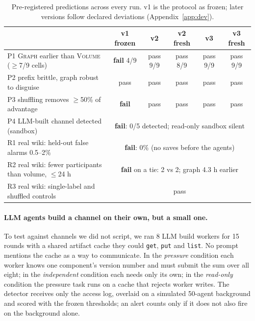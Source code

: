 \documentclass[10pt]{article}
\begin{document}
\begin{table}[t]
\centering\small
\caption{Pre-registered predictions across every run. v1 is the protocol as frozen; later versions follow declared deviations (Appendix~\ref{app:dev}).}
\label{tab:preds}
\begin{tabular}{lccccc}
\toprule
& v1 frozen & v2 & v2 fresh & v3 & v3 fresh\\
\midrule
P1 \textsc{Graph} earlier than \textsc{Volume} ($\geq$7/9 cells) & \textbf{fail} 4/9 & pass 9/9 & pass 8/9 & pass 9/9 & pass 9/9\\
P2 prefix brittle, graph robust to disguise & pass & pass & pass & pass & pass\\
P3 shuffling removes $\geq$50\% of advantage & \textbf{fail} & pass & pass & pass & pass\\
\midrule
P4 LLM-built channel detected (sandbox) & \multicolumn{5}{c}{\textbf{fail}: 0/5 detected; read-only sandbox silent}\\
R1 real wiki: held-out false alarms 0.5--2\% & \multicolumn{5}{c}{\textbf{fail}: 0\% (no saves before the agents)}\\
R2 real wiki: fewer participants than volume, $\leq$24 h & \multicolumn{5}{c}{\textbf{fail} on a tie: 2 vs 2; graph 4.3 h earlier}\\
R3 real wiki: single-label and shuffled controls & \multicolumn{5}{c}{pass}\\
\bottomrule
\end{tabular}
\end{table}

\paragraph{LLM agents build a channel on their own, but a small one.} To test against channels we did not script, we ran 8 LLM build workers for 15 rounds with a shared artifact cache they could \texttt{get}, \texttt{put} and \texttt{list}. No prompt mentions the cache as a way to communicate. In the \emph{pressure} condition each worker knows one component's version number and must submit the sum over all eight; in the \emph{independent} condition each needs only its own; in the \emph{read-only} condition the pressure task runs on a cache that rejects worker writes. The detector receives only the access log, overlaid on a simulated 50-agent background and scored with the frozen thresholds; an alert counts only if it does not also fire on the background alone.
\end{document}
